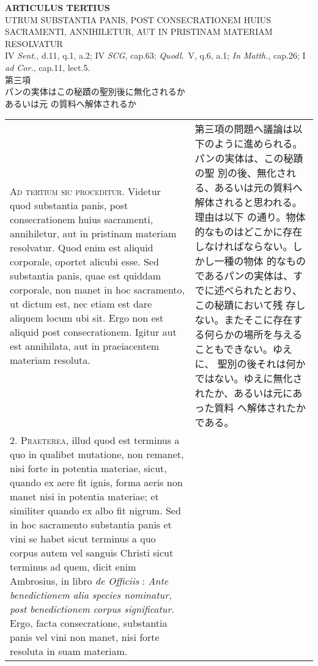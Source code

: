 \documentclass[10pt]{jsarticle} %
\begin{document}
\begin{center}
{\Large {\bf ARTICULUS TERTIUS}}\\ {\large UTRUM SUBSTANTIA PANIS,
POST CONSECRATIONEM HUIUS SACRAMENTI, ANNIHILETUR, AUT IN PRISTINAM
MATERIAM RESOLVATUR}\\ {\footnotesize IV {\itshape Sent.}, d.11, q.1,
a.2; IV {\itshape SCG}, cap.63; {\itshape Quodl}.~V, q.6, a.1;
{\itshape In Matth.}, cap.26; I {\itshape ad Cor.}, cap.11, lect.5.}\\
{\Large 第三項\\パンの実体はこの秘蹟の聖別後に無化されるか\\あるいは元
の質料へ解体されるか}
\end{center}

\begin{longtable}{p{21em}p{21em}}


{\scshape Ad tertium sic proceditur}. Videtur quod substantia panis,
post consecrationem huius sacramenti, annihiletur, aut in pristinam
materiam resolvatur. Quod enim est aliquid corporale, oportet alicubi
esse. Sed substantia panis, quae est quiddam corporale, non manet in
hoc sacramento, ut dictum est, nec etiam est dare aliquem locum ubi
sit. Ergo non est aliquid post consecrationem. Igitur aut est
annihilata, aut in praeiacentem materiam resoluta.

&

第三項の問題へ議論は以下のように進められる。パンの実体は、この秘蹟の聖
別の後、無化される、あるいは元の質料へ解体されると思われる。理由は以下
の通り。物体的なものはどこかに存在しなければならない。しかし一種の物体
的なものであるパンの実体は、すでに述べられたとおり、この秘蹟において残
存しない。またそこに存在する何らかの場所を与えることもできない。ゆえに、
聖別の後それは何かではない。ゆえに無化されたか、あるいは元にあった質料
へ解体されたかである。

\\



2. {\scshape Praeterea}, illud quod est terminus a quo in qualibet
mutatione, non remanet, nisi forte in potentia materiae, sicut, quando
ex aere fit ignis, forma aeris non manet nisi in potentia materiae; et
similiter quando ex albo fit nigrum. Sed in hoc sacramento substantia
panis et vini se habet sicut terminus a quo corpus autem vel sanguis
Christi sicut terminus ad quem, dicit enim Ambrosius, in libro
{\itshape de Officiis} : {\itshape Ante benedictionem alia species
nominatur, post benedictionem corpus significatur}. Ergo, facta
consecratione, substantia panis vel vini non manet, nisi forte
resoluta in suam materiam.


\end{longtable}
\end{document}
